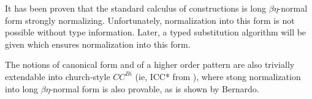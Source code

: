 It has been proven that the standard calculus of constructions is 
long $\beta\eta$-normal form strongly normalizing.  
Unfortunately, normalization into this form is not possible without type 
information.  Later, a typed substitution algorithm will be given which 
ensures normalization into this form.  

The notions of canonical form and of a higher order pattern are also trivially
extendable into church-style $CC^{Bi}$ (ie, ICC* from \citep{barras2008implicit}), 
where stong normalization into long $\beta\eta$-normal form is also provable, as is shown by Bernardo.
